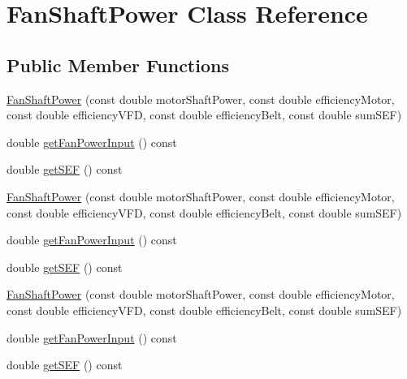 \hypertarget{class_fan_shaft_power}{}\section{Fan\+Shaft\+Power Class Reference}
\label{class_fan_shaft_power}
\subsection*{Public Member Functions}
\begin{DoxyCompactItemize}
\item 
\hyperlink{class_fan_shaft_power_afe665bc2baf1a876d265ebc9129f70e2}{Fan\+Shaft\+Power} (const double motor\+Shaft\+Power, const double efficiency\+Motor, const double efficiency\+V\+FD, const double efficiency\+Belt, const double sum\+S\+EF)
\item 
double \hyperlink{class_fan_shaft_power_a6008dad9482c28d652c6075185d050e9}{get\+Fan\+Power\+Input} () const
\item 
double \hyperlink{class_fan_shaft_power_a7a36d22c2301d3c634fc89e103daa148}{get\+S\+EF} () const
\item 
\hyperlink{class_fan_shaft_power_afe665bc2baf1a876d265ebc9129f70e2}{Fan\+Shaft\+Power} (const double motor\+Shaft\+Power, const double efficiency\+Motor, const double efficiency\+V\+FD, const double efficiency\+Belt, const double sum\+S\+EF)
\item 
double \hyperlink{class_fan_shaft_power_a6008dad9482c28d652c6075185d050e9}{get\+Fan\+Power\+Input} () const
\item 
double \hyperlink{class_fan_shaft_power_a7a36d22c2301d3c634fc89e103daa148}{get\+S\+EF} () const
\item 
\hyperlink{class_fan_shaft_power_afe665bc2baf1a876d265ebc9129f70e2}{Fan\+Shaft\+Power} (const double motor\+Shaft\+Power, const double efficiency\+Motor, const double efficiency\+V\+FD, const double efficiency\+Belt, const double sum\+S\+EF)
\item 
double \hyperlink{class_fan_shaft_power_a6008dad9482c28d652c6075185d050e9}{get\+Fan\+Power\+Input} () const
\item 
double \hyperlink{class_fan_shaft_power_a7a36d22c2301d3c634fc89e103daa148}{get\+S\+EF} () const
\end{DoxyCompactItemize}
